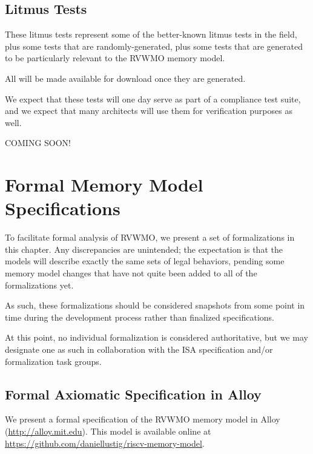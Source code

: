 \section{Litmus Tests}

These litmus tests represent some of the better-known litmus tests in the field, plus some tests that are randomly-generated, plus some tests that are generated to be particularly relevant to the RVWMO memory model.

All will be made available for download once they are generated.

We expect that these tests will one day serve as part of a compliance test suite, and we expect that many architects will use them for verification purposes as well.

COMING SOON!

\chapter{Formal Memory Model Specifications}

\begin{commentary}
  To facilitate formal analysis of RVWMO, we present a set of formalizations in this chapter.  Any discrepancies are unintended; the expectation is that the models will describe exactly the same sets of legal behaviors, pending some memory model changes that have not quite been added to all of the formalizations yet.

  As such, these formalizations should be considered snapshots from some point in time during the development process rather than finalized specifications.

  At this point, no individual formalization is considered authoritative, but we may designate one as such in collaboration with the ISA specification and/or formalization task groups.
\end{commentary}

\section{Formal Axiomatic Specification in Alloy}
\label{sec:alloy}

We present a formal specification of the RVWMO memory model in Alloy (\url{http://alloy.mit.edu}).
This model is available online at \url{https://github.com/daniellustig/riscv-memory-model}.

